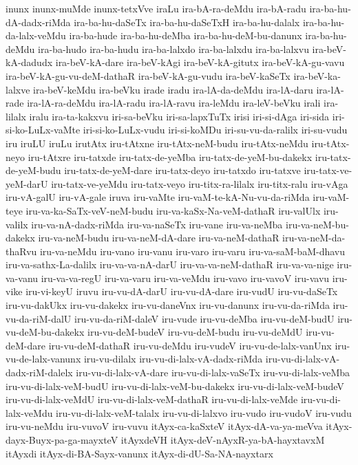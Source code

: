 {inunx
inunx-muMde
inunx-tetxVve
iraLu
ira-bA-ra-deMdu
ira-bA-radu
ira-ba-hu-dA-dadx-riMda
ira-ba-hu-daSeTx
ira-ba-hu-daSeTxH
ira-ba-hu-dalalx
ira-ba-hu-da-lalx-veMdu
ira-ba-hude
ira-ba-hu-deMba
ira-ba-hu-deM-bu-danunx
ira-ba-hu-deMdu
ira-ba-hudo
ira-ba-hudu
ira-ba-lalxdo
ira-ba-lalxdu
ira-ba-lalxvu
ira-beV-kA-dadudx
ira-beV-kA-dare
ira-beV-kAgi
ira-beV-kA-gitutx
ira-beV-kA-gu-vavu
ira-beV-kA-gu-vu-deM-dathaR
ira-beV-kA-gu-vudu
ira-beV-kaSeTx
ira-beV-ka-lalxve
ira-beV-keMdu
ira-beVku
irade
iradu
ira-lA-da-deMdu
ira-lA-daru
ira-lA-rade
ira-lA-ra-deMdu
ira-lA-radu
ira-lA-ravu
ira-leMdu
ira-leV-beVku
irali
ira-lilalx
iralu
ira-ta-kakxvu
iri-sa-beVku
iri-sa-lapxTuTx
irisi
iri-si-dAga
iri-sida
iri-si-ko-LuLx-vaMte
iri-si-ko-LuLx-vudu
iri-si-koMDu
iri-su-vu-da-ralilx
iri-su-vudu
iru
iruLU
iruLu
irutAtx
iru-tAtxne
iru-tAtx-neM-budu
iru-tAtx-neMdu
iru-tAtx-neyo
iru-tAtxre
iru-tatxde
iru-tatx-de-yeMba
iru-tatx-de-yeM-bu-dakekx
iru-tatx-de-yeM-budu
iru-tatx-de-yeM-dare
iru-tatx-deyo
iru-tatxdo
iru-tatxve
iru-tatx-ve-yeM-darU
iru-tatx-ve-yeMdu
iru-tatx-veyo
iru-titx-ra-lilalx
iru-titx-ralu
iru-vAga
iru-vA-galU
iru-vA-gale
iruva
iru-vaMte
iru-vaM-te-kA-Nu-vu-da-riMda
iru-vaM-teye
iru-va-ka-SaTx-veV-neM-budu
iru-va-kaSx-Na-veM-dathaR
iru-valUlx
iru-valilx
iru-va-nA-dadx-riMda
iru-va-naSeTx
iru-vane
iru-va-neMba
iru-va-neM-bu-dakekx
iru-va-neM-budu
iru-va-neM-dA-dare
iru-va-neM-dathaR
iru-va-neM-da-thaRvu
iru-va-neMdu
iru-vano
iru-vanu
iru-varo
iru-varu
iru-va-saM-baM-dhavu
iru-va-sathx-La-dalilx
iru-va-va-nA-darU
iru-va-va-neM-dathaR
iru-va-va-nige
iru-va-vanu
iru-va-va-regU
iru-va-varu
iru-va-veMdu
iru-vavo
iru-vavoV
iru-vavu
iru-vike
iru-vi-keyU
iruvu
iru-vu-dA-darU
iru-vu-dA-dare
iru-vudU
iru-vu-daSeTx
iru-vu-dakUkx
iru-vu-dakekx
iru-vu-daneVnx
iru-vu-danunx
iru-vu-da-riMda
iru-vu-da-riM-dalU
iru-vu-da-riM-daleV
iru-vude
iru-vu-deMba
iru-vu-deM-budU
iru-vu-deM-bu-dakekx
iru-vu-deM-budeV
iru-vu-deM-budu
iru-vu-deMdU
iru-vu-deM-dare
iru-vu-deM-dathaR
iru-vu-deMdu
iru-vudeV
iru-vu-de-lalx-vanUnx
iru-vu-de-lalx-vanunx
iru-vu-dilalx
iru-vu-di-lalx-vA-dadx-riMda
iru-vu-di-lalx-vA-dadx-riM-dalelx
iru-vu-di-lalx-vA-dare
iru-vu-di-lalx-vaSeTx
iru-vu-di-lalx-veMba
iru-vu-di-lalx-veM-budU
iru-vu-di-lalx-veM-bu-dakekx
iru-vu-di-lalx-veM-budeV
iru-vu-di-lalx-veMdU
iru-vu-di-lalx-veM-dathaR
iru-vu-di-lalx-veMde
iru-vu-di-lalx-veMdu
iru-vu-di-lalx-veM-talalx
iru-vu-di-lalxvo
iru-vudo
iru-vudoV
iru-vudu
iru-vu-neMdu
iru-vuvoV
iru-vuvu
itAyx-ca-kaSxteV
itAyx-dA-va-ya-meVva
itAyx-dayx-Buyx-pa-ga-mayxteV
itAyxdeVH
itAyx-deV-nAyxR-ya-bA-hayxtavxM
itAyxdi
itAyx-di-BA-Sayx-vanunx
itAyx-di-dU-Sa-NA-nayxtarx
}
